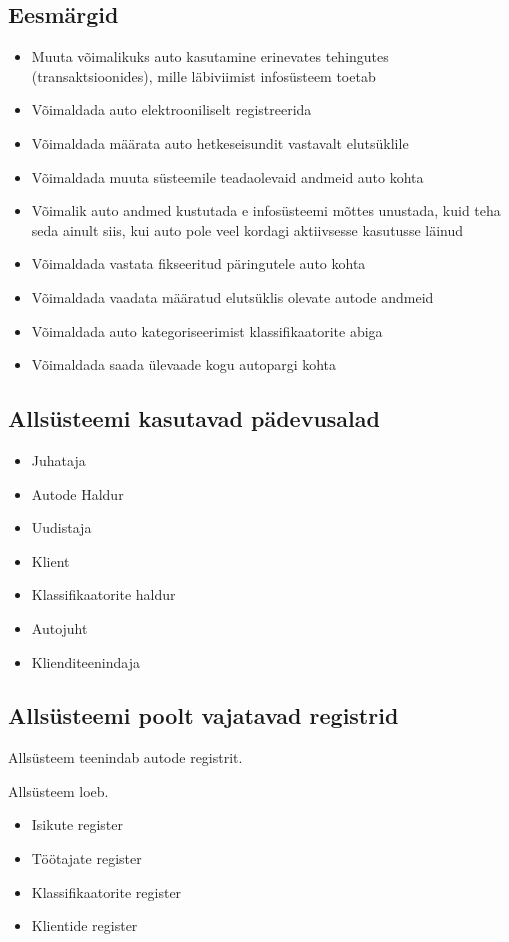 \documentclass{report}
\begin{document}
\subsection{Eesmärgid}
\begin{itemize}
	\item Muuta võimalikuks auto kasutamine erinevates tehingutes (transaktsioonides), mille läbiviimist infosüsteem toetab
	\item Võimaldada auto elektrooniliselt registreerida
	\item Võimaldada määrata auto hetkeseisundit vastavalt elutsüklile
	\item Võimaldada muuta süsteemile teadaolevaid andmeid auto kohta
	\item Võimalik auto andmed kustutada e infosüsteemi mõttes unustada, kuid teha seda ainult siis, kui auto pole veel kordagi aktiivsesse kasutusse läinud
	\item Võimaldada vastata fikseeritud päringutele auto kohta
	\item Võimaldada vaadata määratud elutsüklis olevate autode andmeid
	\item Võimaldada auto kategoriseerimist klassifikaatorite abiga
	\item Võimaldada saada ülevaade kogu autopargi kohta
\end{itemize}
 
\subsection{Allsüsteemi kasutavad pädevusalad}
\begin{itemize}
	\item Juhataja
	\item Autode Haldur
	\item Uudistaja
	\item Klient
	\item Klassifikaatorite haldur
	\item Autojuht
	\item Klienditeenindaja
\end{itemize}

\subsection{Allsüsteemi poolt vajatavad registrid}
Allsüsteem teenindab autode registrit.
\\
\par
Allsüsteem loeb.
\begin{itemize}
	\item Isikute register
	\item Töötajate register
	\item Klassifikaatorite register
	\item Klientide register
\end{itemize}
\end{document}
